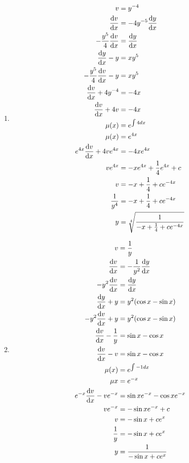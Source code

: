 \documentclass[10pt,\jkfside,a4paper]{article}
\begin{document}
\begin{enumerate}
\begin{enumerate}
\item
\begin{equation}
\begin{split}
v &= y^{-4}\\
\dv{v}{x} &= -4y^{-5}\dv{y}{x}\\
-\frac{y^5}{4}\dv{v}{x} &= \dv{y}{x}\\
\dv{y}{x} - y &= xy^5\\
-\frac{y^5}{4}\dv{v}{x} - y &= xy^5\\
\dv{v}{x} + 4y^{-4} &= -4x\\
\dv{v}{x} + 4v &= -4x\\
\mu(x) &= e^{\int 4 dx}\\
\mu(x) &= e^{4x}\\
e^{4x}\dv{v}{x} + 4ve^{4x} &= -4xe^{4x}\\
ve^{4x} &= -xe^{4x} + \frac{1}{4}e^{4x} + c\\
v &= -x + \frac{1}{4} + ce^{-4x}\\
\frac{1}{y^4} &= -x + \frac{1}{4} + ce^{-4x}\\
y &= \sqrt[4]{\frac{1}{-x + \frac{1}{4} + ce^{-4x}}}
\end{split}
\end{equation}

\item
\begin{equation}
\begin{split}
v &= \frac{1}{y}\\
\dv{v}{x} &= -\frac{1}{y^2}\dv{y}{x}\\
-y^2\dv{v}{x} &= \dv{y}{x}\\
\dv{y}{x} + y &= y^2(\cos{x} - \sin{x})\\
-y^2\dv{v}{x} + y &= y^2(\cos{x} - \sin{x})\\
\dv{v}{x} - \frac{1}{y} &= \sin{x} - \cos{x}\\
\dv{v}{x} - v &= \sin{x} - \cos{x}\\
\mu(x) &= e^{\int-1dx}\\
\mu{x} &= e^{-x}\\
e^{-x}\dv{v}{x} - ve^{-x} &= \sin{x}e^{-x} - \cos{x}e^{-x}\\
ve^{-x} &= -\sin{x}e^{-x} + c\\
v &= -\sin{x} + ce^x\\
\frac{1}{y} &= -\sin{x} + ce^x\\
y &= \frac{1}{-\sin{x} + ce^x}\\
\end{split}
\end{equation}


\end{enumerate}
\end{enumerate}
\end{document}
